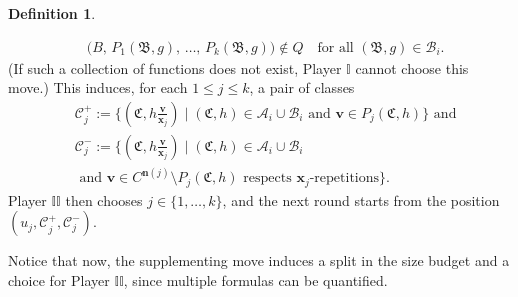 \documentclass{article}
\theoremstyle{definition}
\newtheorem{definition}[theorem]{Definition}
\begin{document}
\begin{definition}
\begin{enumerate}
\begin{enumerate}
\begin{align*}
                &\big(B,\, P_1(\mathfrak{B},g),\, \ldots,\, P_k(\mathfrak{B},g)\big) \notin Q \quad \text{for all } (\mathfrak{B},g) \in \mathcal{B}_i.
            \end{align*}
            (If such a collection of functions does not exist, Player $\mathbb{I}$ cannot choose this move.) This induces, for each $1\leq j\leq k$, a pair of classes
            \begin{align*}
                &\mathcal{C}^+_j:=\{(\mathfrak{C},h \frac{\textbf{v}}{\textbf{x}_j})\mid (\mathfrak{C},h)\in \mathcal{A}_i\cup \mathcal{B}_i \text{ and }\textbf{v}\in P_j(\mathfrak{C},h)\} \text{ and}\\
                &\mathcal{C}^-_j:=\{(\mathfrak{C},h \frac{\textbf{v}}{\textbf{x}_j})\mid (\mathfrak{C},h)\in \mathcal{A}_i\cup \mathcal{B}_i\\&\text{ and }\textbf{v}\in C^{\textbf{n}(j)}\setminus P_j(\mathfrak{C},h) \text{ respects }\textbf{x}_j\text{-repetitions}\}.
            \end{align*}
            Player $\mathbb{II}$ then chooses $j\in\{1,\dots,k\}$, and the next round starts from the position $(u_j,\mathcal{C}^+_j,\mathcal{C}^-_j)$.
        \end{enumerate}
    \end{enumerate}
\end{definition}

Notice that now, the supplementing move induces a split in the size budget and a choice for Player $\mathbb{II}$, since multiple formulas can be quantified.
\end{document}
